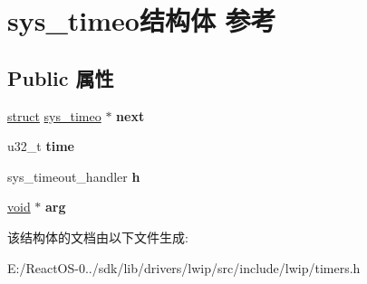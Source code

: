 \hypertarget{structsys__timeo}{}\section{sys\+\_\+timeo结构体 参考}
\label{structsys__timeo}
\subsection*{Public 属性}
\begin{DoxyCompactItemize}
\item 
\mbox{\label{structsys__timeo_addfc1875758f06d6036f5dda30beed9e}} 
\hyperlink{interfacestruct}{struct} \hyperlink{structsys__timeo}{sys\+\_\+timeo} $\ast$ {\bfseries next}
\item 
\mbox{\label{structsys__timeo_a7641719a0ce0daec85e86f188f03bca1}} 
u32\+\_\+t {\bfseries time}
\item 
\mbox{\label{structsys__timeo_a483e9c13d60e0adf6731869daa3e8b4d}} 
sys\+\_\+timeout\+\_\+handler {\bfseries h}
\item 
\mbox{\label{structsys__timeo_a74e07a9d80232319984ee3112e91eef3}} 
\hyperlink{interfacevoid}{void} $\ast$ {\bfseries arg}
\end{DoxyCompactItemize}


该结构体的文档由以下文件生成\+:\begin{DoxyCompactItemize}
\item 
E\+:/\+React\+O\+S-\/0../sdk/lib/drivers/lwip/src/include/lwip/timers.\+h\end{DoxyCompactItemize}

